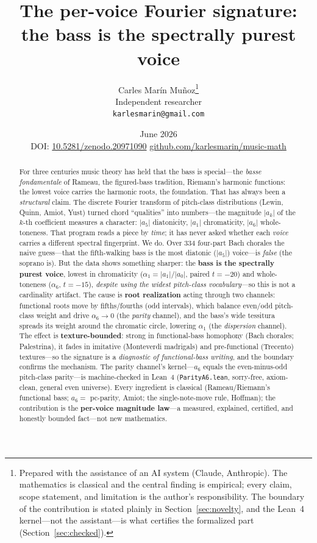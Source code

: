 \documentclass[11pt]{article}
\title{\bf The per-voice Fourier signature:\\ the bass is the spectrally purest voice}
\author{Carles Mar\'in Mu\~noz\thanks{Prepared with the assistance of an AI system (Claude, Anthropic).
The mathematics is classical and the central finding is empirical; every claim, scope statement, and
limitation is the author's responsibility. The boundary of the contribution is stated plainly in
Section~\ref{sec:novelty}, and the Lean~4 kernel---not the assistant---is what certifies the formalized
part (Section~\ref{sec:checked}).}\\[3pt]
  \normalsize Independent researcher\\
  \normalsize \texttt{karlesmarin@gmail.com}}
\date{June 2026\\[3pt]\normalsize DOI: \href{https://doi.org/10.5281/zenodo.20971090}{10.5281/zenodo.20971090}
\quad\textbullet\quad \href{https://github.com/karlesmarin/music-math}{github.com/karlesmarin/music-math}}
\newcommand{\lean}[1]{\texttt{#1}}
\begin{document}
\maketitle

\begin{abstract}\noindent
For three centuries music theory has held that the bass is special---the \emph{basse fondamentale} of
Rameau, the figured-bass tradition, Riemann's harmonic functions: the lowest voice carries the harmonic
roots, the foundation. That has always been a \emph{structural} claim. The discrete Fourier transform of
pitch-class distributions (Lewin, Quinn, Amiot, Yust) turned chord ``qualities'' into numbers---the
magnitude $|a_k|$ of the $k$-th coefficient measures a character: $|a_5|$ diatonicity, $|a_1|$
chromaticity, $|a_6|$ whole-toneness. That program reads a piece by \emph{time}; it has never asked whether
each \emph{voice} carries a different spectral fingerprint. We do. Over $334$ four-part Bach chorales the
naive guess---that the fifth-walking bass is the most diatonic ($|a_5|$) voice---is \emph{false} (the
soprano is). But the data shows something sharper: the \textbf{bass is the spectrally purest voice}, lowest
in chromaticity ($\alpha_1=|a_1|/|a_0|$, paired $t=-20$) and whole-toneness ($\alpha_6$, $t=-15$),
\emph{despite using the widest pitch-class vocabulary}---so this is not a cardinality artifact. The cause is
\textbf{root realization} acting through two channels: functional roots move by fifths/fourths (odd
intervals), which balance even/odd pitch-class weight and drive $\alpha_6\!\to\!0$ (the \emph{parity}
channel), and the bass's wide tessitura spreads its weight around the chromatic circle, lowering $\alpha_1$
(the \emph{dispersion} channel). The effect is \textbf{texture-bounded}: strong in functional-bass
homophony (Bach chorales; Palestrina), it fades in imitative (Monteverdi madrigals) and pre-functional
(Trecento) textures---so the signature is a \emph{diagnostic of functional-bass writing}, and the boundary
confirms the mechanism. The parity channel's kernel---$a_6$ equals the even-minus-odd pitch-class
parity---is machine-checked in Lean~4 (\lean{ParityA6.lean}, sorry-free, axiom-clean, general even
universe). Every ingredient is classical (Rameau/Riemann's functional bass; $a_6=$ pc-parity, Amiot;
the single-note-move rule, Hoffman); the contribution is the \textbf{per-voice magnitude law}---a measured,
explained, certified, and honestly bounded fact---not new mathematics.
\end{abstract}
\end{document}
